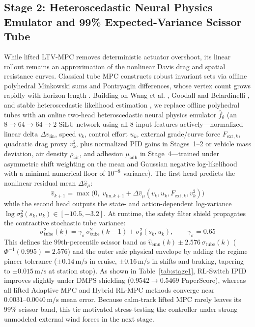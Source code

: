 \documentclass[10pt,a4paper]{article}
\begin{document}
\subsection{Stage 2: Heteroscedastic Neural Physics Emulator and 99\% Expected-Variance Scissor Tube}
While lifted LTV-MPC removes deterministic actuator overshoot, its linear rollout remains an approximation of the nonlinear Davis drag and spatial resistance curves. Classical tube MPC constructs robust invariant sets via offline polyhedral Minkowski sums and Pontryagin differences, whose vertex count grows rapidly with horizon length \cite{ref8, ref9, ref18}. Building on Wang et al. \cite{ref7}, Goodall and Belardinelli \cite{ref4, ref5}, and stable heteroscedastic likelihood estimation \cite{ref33}, we replace offline polyhedral tubes with an online two-head heteroscedastic neural physics emulator $\hat{f}_\theta$ (an $8 \to 64 \to 64 \to 2$ SiLU network using all 8 input features actively—normalized linear delta $\Delta v_{\text{lin}}$, speed $v_k$, control effort $u_k$, external grade/curve force $F_{\text{ext},k}$, quadratic drag proxy $v_k^2$, plus normalized PID gains in Stages~1--2 or vehicle mass deviation, air density $\rho_{\text{air}}$, and adhesion $\mu_{\text{adh}}$ in Stage~4—trained under asymmetric shift weighting on the mean and Gaussian negative log-likelihood with a minimal numerical floor of $10^{-8}$ variance). The first head predicts the nonlinear residual mean $\Delta\hat{v}_\mu$:
\begin{equation}
\hat{v}_{k+1} = \max\big(0, \; v_{\text{lin},k+1} + \Delta\hat{v}_\mu(v_k, u_k, F_{\text{ext},k}, v_k^2)\big)
\end{equation}
while the second head outputs the state- and action-dependent log-variance $\log \sigma_\theta^2(s_k, u_k) \in [-10.5, -3.2]$. At runtime, the safety filter shield \cite{ref3, ref4, ref6} propagates the contractive stochastic tube variance:
\begin{equation}
\sigma_{\text{tube}}^2(k) = \gamma_\sigma\,\sigma_{\text{tube}}^2(k-1) + \sigma_\theta^2(s_k, u_k), \qquad \gamma_\sigma = 0.65
\label{eq:tube_var}
\end{equation}
This defines the 99th-percentile scissor band as $\hat{v}_{\text{emu}}(k) \pm 2.576\,\sigma_{\text{tube}}(k)$ ($\Phi^{-1}(0.995) = 2.576$) and the outer safe physical envelope by adding the regime pincer tolerance ($\pm 0.14\,\text{m/s}$ in cruise, $\pm 0.16\,\text{m/s}$ in shifts and braking, tapering to $\pm 0.015\,\text{m/s}$ at station stop). As shown in Table~\ref{tab:stage1}, RL-Switch IPID improves slightly under DMPS shielding ($0.9542 \to 0.5469$ PaperScore), whereas all lifted Adaptive MPC and Hybrid RL-MPC methods converge near $0.0031\text{--}0.0040\,\text{m/s}$ mean error. Because calm-track lifted MPC rarely leaves its 99\% scissor band, this tie motivated stress-testing the controller under strong unmodeled external wind forces in the next stage.
\end{document}

